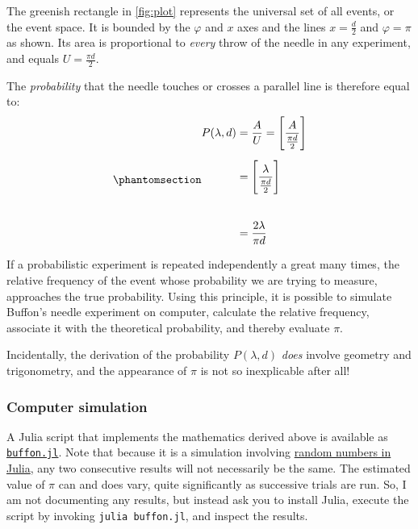 \documentclass[
  a4paper,
]{article}
\begin{document}
The greenish rectangle in \cref{fig:plot} represents the universal set
of all events, or the event space. It is bounded by the \(\varphi\) and
\(x\) axes and the lines \(x =\frac{d}{2}\) and \(\varphi = \pi\) as
shown. Its area is proportional to \emph{every} throw of the needle in
any experiment, and equals \(U = \frac{\pi d}{2}\).

The \emph{probability} that the needle touches or crosses a parallel
line is therefore equal to:
\begin{equation}\phantomsection\label{eq:fraction-successes}{
\begin{aligned}
P(\lambda, d) &= \displaystyle\frac{A}{U} = \displaystyle \left[ \frac{A}{\frac{\pi d}{2}} \right] \\[0.5em]
&= \displaystyle \left[ \frac{\lambda}{\frac{\pi d}{2}}\right ]\\[2em]
&= \displaystyle \frac{2\lambda}{\pi d}
\end{aligned}
}\end{equation}

If a probabilistic experiment is repeated independently a great many
times, the relative frequency of the event whose probability we are
trying to measure, approaches the true probability. Using this
principle, it is possible to simulate Buffon's needle experiment on
computer, calculate the relative frequency, associate it with the
theoretical probability, and thereby evaluate \(\pi\).

Incidentally, the derivation of the probability \(P(\lambda, d)\)
\emph{does} involve geometry and trigonometry, and the appearance of
\(\pi\) is not so inexplicable after all!  \normalfont

\subsubsection{Computer simulation}\label{computer-simulation}

A Julia script that implements the mathematics derived above is
available as \href{\%7Battacheauxiliary/boffon.jl}{\texttt{buffon.jl}}.
Note that because it is a simulation involving
\href{https://docs.julialang.org/en/v1/stdlib/Random/}{random numbers in
Julia}, any two consecutive results will not necessarily be the same.
The estimated value of \(\pi\) can and does vary, quite significantly as
successive trials are run. So, I am not documenting any results, but
instead ask you to install Julia, execute the script by invoking
\texttt{julia\ buffon.jl}, and inspect the results.
\end{document}
